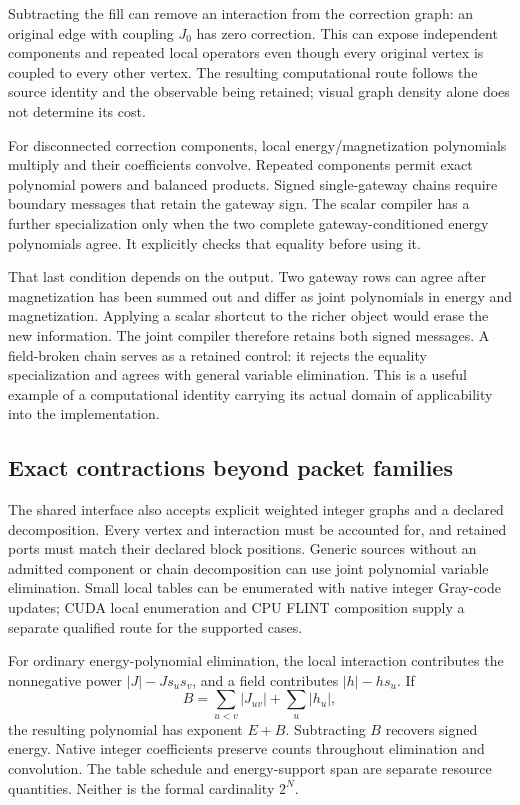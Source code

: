 Subtracting the fill can remove an interaction from the correction graph: an original edge with coupling $J_0$ has zero correction. This can expose independent components and repeated local operators even though every original vertex is coupled to every other vertex. The resulting computational route follows the source identity and the observable being retained; visual graph density alone does not determine its cost.

For disconnected correction components, local energy/magnetization polynomials multiply and their coefficients convolve. Repeated components permit exact polynomial powers and balanced products. Signed single-gateway chains require boundary messages that retain the gateway sign. The scalar compiler has a further specialization only when the two complete gateway-conditioned energy polynomials agree. It explicitly checks that equality before using it.

That last condition depends on the output. Two gateway rows can agree after magnetization has been summed out and differ as joint polynomials in energy and magnetization. Applying a scalar shortcut to the richer object would erase the new information. The joint compiler therefore retains both signed messages. A field-broken chain serves as a retained control: it rejects the equality specialization and agrees with general variable elimination. This is a useful example of a computational identity carrying its actual domain of applicability into the implementation.

\subsection{Exact contractions beyond packet families}

The shared interface also accepts explicit weighted integer graphs and a declared decomposition. Every vertex and interaction must be accounted for, and retained ports must match their declared block positions. Generic sources without an admitted component or chain decomposition can use joint polynomial variable elimination. Small local tables can be enumerated with native integer Gray-code updates; CUDA local enumeration and CPU FLINT composition supply a separate qualified route for the supported cases.

For ordinary energy-polynomial elimination, the local interaction contributes the nonnegative power $|J|-Js_us_v$, and a field contributes $|h|-hs_u$. If
\begin{equation}
 B=\sum_{u<v}|J_{uv}|+\sum_u|h_u|,
\end{equation}
the resulting polynomial has exponent $E+B$. Subtracting $B$ recovers signed energy. Native integer coefficients preserve counts throughout elimination and convolution. The table schedule and energy-support span are separate resource quantities. Neither is the formal cardinality $2^N$.

